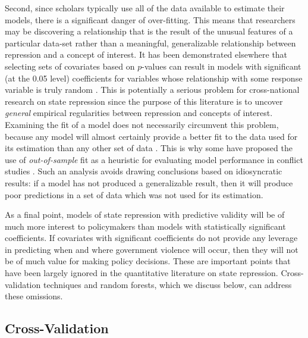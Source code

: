 \documentclass[11pt]{article}
\begin{document}
Second, since scholars typically use all of the data available to estimate their models, there is a significant danger of over-fitting. This means that researchers may be discovering a relationship that is the result of the unusual features of a particular data-set rather than a meaningful, generalizable relationship between repression and a concept of interest. It has been demonstrated elsewhere that selecting sets of covariates based on $p$-values can result in models with significant (at the 0.05 level) coefficients for variables whose relationship with some response variable is truly random \citep{Freedman1983}. This is potentially a serious problem for cross-national research on state repression since the purpose of this literature is to uncover {\em general} empirical regularities between repression and concepts of interest. Examining the fit of a model does not necessarily circumvent this problem, because any model will almost certainly provide a better fit to the data used for its estimation than any other set of data \citep[See, e.g.][]{PicardCook1984}. This is why some have proposed the use of {\em out-of-sample} fit as a heuristic for evaluating model performance in conflict studies \citep{BeckKingZeng2000,Wardetal2010}. Such an analysis avoids drawing conclusions based on idiosyncratic results: if a model has not produced a generalizable result, then it will produce poor predictions in a set of data which was not used for its estimation. 

As a final point, models of state repression with predictive validity will be of much more interest to policymakers than models with statistically significant coefficients. If covariates with significant coefficients do not provide any leverage in predicting when and where government violence will occur, then they will not be of much value for making policy decisions. These are important points that have been largely ignored in the quantitative literature  on state repression. Cross-validation techniques and random forests, which we discuss below, can address these omissions.

\subsection{Cross-Validation}
\end{document}
